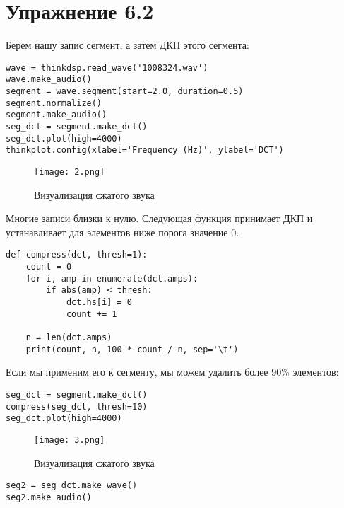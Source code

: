 \documentclass[a4paper,12pt]{report}
\begin{document}
\chapter{Упражнение 6.2}

Берем нашу запис сегмент, а затем ДКП этого сегмента:

\begin{lstlisting}[caption=Загрузка звука и сегмент]
wave = thinkdsp.read_wave('1008324.wav')
wave.make_audio()
segment = wave.segment(start=2.0, duration=0.5)
segment.normalize()
segment.make_audio()
seg_dct = segment.make_dct()
seg_dct.plot(high=4000)
thinkplot.config(xlabel='Frequency (Hz)', ylabel='DCT')
\end{lstlisting}

\begin{figure}[H]
        \centering
        \texttt{[image: 2.png]}
        \caption{Визуализация сжатого звука}
        \label{fig:lab6_fig2_1}
\end{figure}

Многие записи близки к нулю. Следующая функция принимает ДКП и устанавливает для элементов ниже порога значение 0.

\begin{lstlisting}[caption=Функция \texttt{compress}]
def compress(dct, thresh=1):
    count = 0
    for i, amp in enumerate(dct.amps):
        if abs(amp) < thresh:
            dct.hs[i] = 0
            count += 1
            
    n = len(dct.amps)
    print(count, n, 100 * count / n, sep='\t')
\end{lstlisting}

Если мы применим его к сегменту, мы можем удалить более 90\% элементов:

\begin{lstlisting}[caption=Сжатие звука]
seg_dct = segment.make_dct()
compress(seg_dct, thresh=10)
seg_dct.plot(high=4000)
\end{lstlisting}

\begin{figure}[H]
        \centering
        \texttt{[image: 3.png]}
        \caption{Визуализация сжатого звука}
        \label{fig:lab6_fig2_2}
\end{figure}

\begin{lstlisting}[caption=Воспроизведение сжатого звука]
seg2 = seg_dct.make_wave()
seg2.make_audio()
\end{lstlisting}
\end{document}
